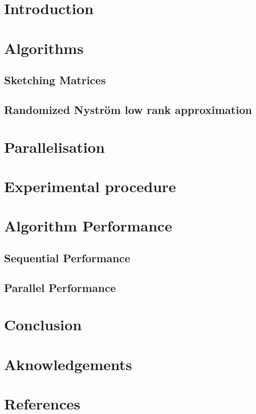 \documentclass[a4paper, 12pt,oneside]{article}
\begin{document}
 
	 
	\clearpage
	\tableofcontents
	\thispagestyle{empty}
	\clearpage
	\setcounter{page}{1}


	\section{Introduction}
	\section{Algorithms}
        \subsection{Sketching Matrices}
        \subsection{Randomized Nyström low rank approximation}
	\section{Parallelisation}
	\section{Experimental procedure}
	\section{Algorithm Performance}
        \subsection{Sequential Performance}
        \subsection{Parallel Performance}
	\section{Conclusion}
	\section*{Aknowledgements}
	\section*{References}
\end{document}
